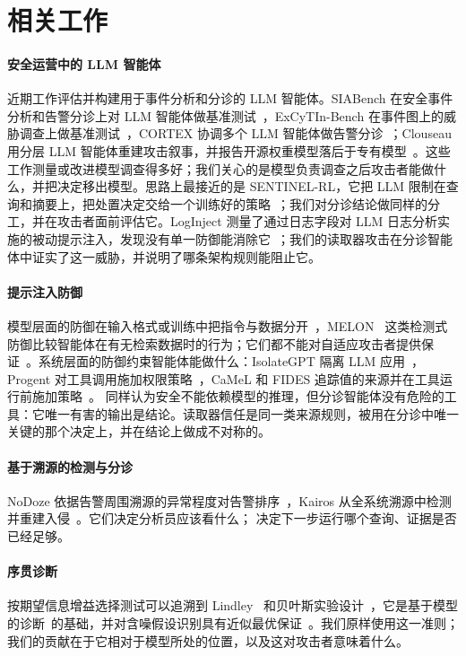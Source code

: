 \section{相关工作}
\label{sec:related}

\paragraph{安全运营中的 LLM 智能体} 近期工作评估并构建用于事件分析和分诊的 LLM 智能体。SIABench 在安全事件分析和告警分诊上对 LLM 智能体做基准测试~\citep{siabench}，ExCyTIn-Bench 在事件图上的威胁调查上做基准测试~\citep{excytin}，CORTEX 协调多个 LLM 智能体做告警分诊~\citep{cortex}；Clouseau 用分层 LLM 智能体重建攻击叙事，并报告开源权重模型落后于专有模型~\citep{clouseau}。这些工作测量或改进模型调查得多好；我们关心的是模型负责调查之后攻击者能做什么，并把决定移出模型。思路上最接近的是 SENTINEL-RL，它把 LLM 限制在查询和摘要上，把处置决定交给一个训练好的策略~\citep{sentinelrl}；我们对分诊结论做同样的分工，并在攻击者面前评估它。LogInject 测量了通过日志字段对 LLM 日志分析实施的被动提示注入，发现没有单一防御能消除它~\citep{loginject}；我们的读取器攻击在分诊智能体中证实了这一威胁，并说明了哪条架构规则能阻止它。

\paragraph{提示注入防御} 模型层面的防御在输入格式或训练中把指令与数据分开~\citep{struq,secalign}，MELON~\citep{melon} 这类检测式防御比较智能体在有无检索数据时的行为；它们都不能对自适应攻击者提供保证~\citep{promptinjection_bench,agentdojo}。系统层面的防御约束智能体能做什么：IsolateGPT 隔离 LLM 应用~\citep{isolategpt}，Progent 对工具调用施加权限策略~\citep{progent}，CaMeL 和 FIDES 追踪值的来源并在工具运行前施加策略~\citep{camel,fides}。\hesp{} 同样认为安全不能依赖模型的推理，但分诊智能体没有危险的工具：它唯一有害的输出是结论。读取器信任是同一类来源规则，被用在分诊中唯一关键的那个决定上，并在结论上做成不对称的。

\paragraph{基于溯源的检测与分诊} NoDoze 依据告警周围溯源的异常程度对告警排序~\citep{nodoze}，Kairos 从全系统溯源中检测并重建入侵~\citep{kairos}。它们决定分析员应该看什么；\hesp{} 决定下一步运行哪个查询、证据是否已经足够。

\paragraph{序贯诊断} 按期望信息增益选择测试可以追溯到 Lindley~\citep{lindley1956} 和贝叶斯实验设计~\citep{chaloner1995}，它是基于模型的诊断~\citep{dekleer1987}的基础，并对含噪假设识别具有近似最优保证~\citep{dasgupta2004,golovin2010}。我们原样使用这一准则；我们的贡献在于它相对于模型所处的位置，以及这对攻击者意味着什么。
